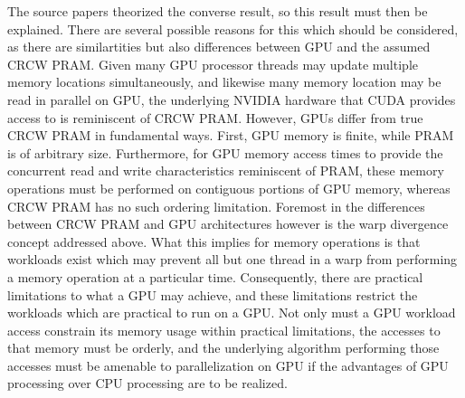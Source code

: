 \documentclass[letterpaper, 12pt]{article}
\begin{document}
The source papers theorized the converse result, so this result must then be explained.  There are several possible reasons for this which should be considered, as there are similartities but also differences between GPU and the assumed CRCW PRAM.  Given many GPU processor threads may update multiple memory locations simultaneously, and likewise many memory location may be read in parallel on GPU, the underlying NVIDIA hardware that CUDA provides access to is reminiscent of CRCW PRAM.  However, GPUs differ from true CRCW PRAM in fundamental ways.  First, GPU memory is finite, while PRAM is of arbitrary size.  Furthermore, for GPU memory access times to provide the concurrent read and write characteristics reminiscent of PRAM, these memory operations must be performed on contiguous portions of GPU memory, whereas CRCW PRAM has no such ordering limitation.  Foremost in the differences between CRCW PRAM and GPU architectures however is the warp divergence concept addressed above.  What this implies for memory operations is that workloads exist which may prevent all but one thread in a warp from performing a memory operation at a particular time.  Consequently, there are practical limitations to what a GPU may achieve, and these limitations restrict the workloads which are practical to run on a GPU.  Not only must a GPU workload access constrain its memory usage within practical limitations, the accesses to that memory must be orderly, and the underlying algorithm performing those accesses must be amenable to parallelization on GPU if the advantages of GPU processing over CPU processing are to be realized\cite{dehne2010exploring}.  




\nocite{*}
\end{document}

